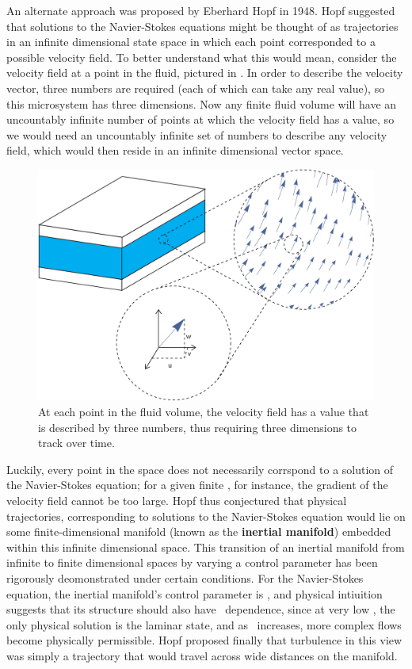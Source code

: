 An alternate approach was proposed by Eberhard Hopf in 1948. Hopf suggested that solutions to the Navier-Stokes equations might be thought of as trajectories in an infinite dimensional state space in which each point corresponded to a possible velocity field. To better understand what this would mean, consider the velocity field at a point in the fluid, pictured in . In order to describe the velocity vector, three numbers are required (each of which can take any real value), so this microsystem has three dimensions. Now any finite fluid volume will have an uncountably infinite number of points at which the velocity field has a value, so we would need an uncountably infinite set of numbers to describe any velocity field, which would then reside in an infinite dimensional vector space.
\begin{figure}
\centerline{
\includegraphics[scale=0.6]{Figs/VectorSpace}}
\caption{At each point in the fluid volume, the velocity field has a value that is described by three numbers, thus requiring three dimensions to track over time.}\label{fig:VectorSpace}
\end{figure}
Luckily, every point in the space does not necessarily corrspond to a solution of the Navier-Stokes equation; for a given finite \ReN, for instance, the gradient of the velocity field cannot be too large. Hopf thus conjectured that physical trajectories, corresponding to solutions to the Navier-Stokes equation would lie on some finite-dimensional manifold (known as the {\bf inertial manifold}) embedded within this infinite dimensional space. This transition of an inertial manifold from infinite to finite dimensional spaces by varying a control parameter has been rigorously deomonstrated under certain conditions. For the Navier-Stokes equation, the inertial manifold's control parameter is \ReN, and physical intiuition suggests that its structure should also have \ReN~dependence, since at very low \ReN, the only physical solution is the laminar state, and as \ReN~increases, more complex flows become physically permissible. Hopf proposed finally that turbulence in this view was simply a trajectory that would travel across wide distances on the manifold. \\
